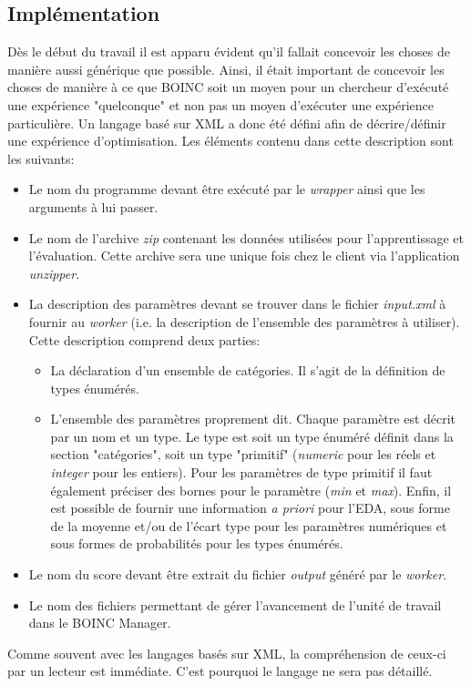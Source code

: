 \documentclass[a4paper, 11pt]{article}
\begin{document}
\subsection{Implémentation}
Dès le début du travail il est apparu évident qu'il fallait concevoir les choses de manière aussi générique que possible. Ainsi, il était important de concevoir les choses de manière à ce que \textsc{BOINC} soit un moyen pour un chercheur d'exécuté une expérience "quelconque" et non pas un moyen d'exécuter une expérience particulière. Un langage basé sur XML a donc été défini afin de décrire/définir une expérience d'optimisation. Les éléments contenu dans cette description sont les suivants:
\begin{itemize}
\item Le nom du programme devant être exécuté par le \textit{wrapper} ainsi que les arguments à lui passer.
\item Le nom de l'archive \textit{zip} contenant les données utilisées pour l'apprentissage et l'évaluation. %
Cette archive sera une unique fois chez le client via l'application \textit{unzipper}.
\item La description des paramètres devant se trouver dans le fichier \textit{input.xml} à fournir au \textit{worker} (i.e. la description de l'ensemble des paramètres à utiliser). Cette description comprend deux parties:
	\begin{itemize}
	\item La déclaration d'un ensemble de catégories. Il s'agit de la définition de types énumérés. %
	\item L'ensemble des paramètres proprement dit. Chaque paramètre est décrit par un nom et un type. Le type est soit un type énuméré définit dans la section "catégories", soit un type "primitif" (\textit{numeric} pour les réels et \textit{integer} pour les entiers).  Pour les paramètres de type primitif il faut également préciser des bornes pour le paramètre (\textit{min} et \textit{max}). Enfin, il est possible de fournir une information \textit{a priori} pour l'EDA, sous forme de la moyenne et/ou de l'écart type pour les paramètres numériques et sous formes de probabilités pour les types énumérés.
	\end{itemize}
\item Le nom du score devant être extrait du fichier \textit{output} généré par le \textit{worker}.
\item Le nom des fichiers permettant de gérer l'avancement de l'unité de travail dans le \textsc{BOINC} Manager. %
\end{itemize}
Comme souvent avec les langages basés sur XML, la compréhension de ceux-ci par un lecteur est immédiate. C'est pourquoi le langage ne sera pas détaillé. %
\end{document}
